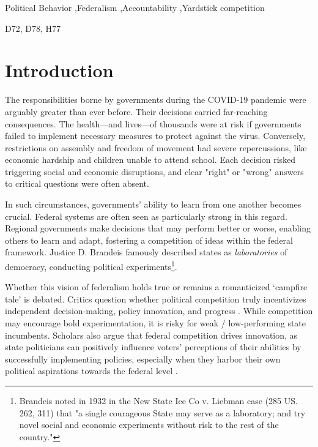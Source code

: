 \documentclass[authoryear,12pt, 3p]{elsarticle} %
\theoremstyle{break}
\begin{document}
\begin{frontmatter}
\begin{keyword}
Political Behavior \sep Federalism \sep Accountability \sep Yardstick competition

\JEL D72, D78,  H77
\end{keyword}
\end{frontmatter}
	
\linenumbers
	
\section[Introduction]{Introduction}\label{sec.introduction}
The responsibilities borne by governments during the COVID-19 pandemic were arguably greater than ever before. Their decisions carried far-reaching consequences. The health—and lives—of thousands were at risk if governments failed to implement necessary measures to protect against the virus. Conversely, restrictions on assembly and freedom of movement had severe repercussions, like  economic hardship and children unable to attend school. Each decision risked triggering social and economic disruptions, and clear "right" or "wrong" answers to critical questions were often absent.

In such circumstances, governments' ability to learn from one another becomes crucial. Federal systems are often seen as particularly strong in this regard. Regional governments make decisions that may perform better or worse, enabling others to learn and adapt, fostering a competition of ideas within the federal framework. Justice D. Brandeis famously described states as \textit{laboratories} of democracy, conducting political experiments\footnote{Brandeis noted in 1932 in the New State Ice Co v. Liebman case (285 US. 262, 311) that "a single courageous State may serve as a laboratory; and try novel social and economic experiments without risk to the rest of the country."}.

Whether this vision of federalism holds true or remains a romanticized `campfire tale' \citep{Tyler2022} is debated. Critics question whether political competition truly incentivizes independent decision-making, policy innovation, and progress \citep{RoseAckerman1980, Weaver1986, Strumpf2002}. While competition may encourage bold experimentation, it is risky for weak / low-performing state incumbents. Scholars also argue that federal competition drives innovation, as state politicians can positively influence voters' perceptions of their abilities by successfully implementing policies, especially when they harbor their own political aspirations towards the federal level \citep{KotSchwager2006}.
\end{document}
